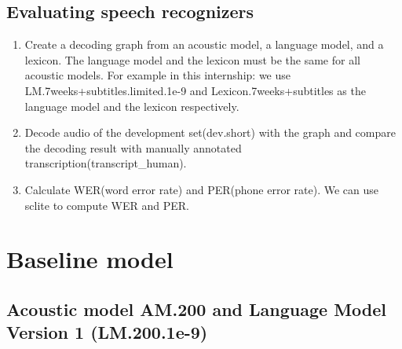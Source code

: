 \subsection{Evaluating speech recognizers}
\begin{enumerate}
\item Create a decoding graph from an acoustic model, a language model, and a lexicon. The language model and the lexicon must be the same for all acoustic models. For example in this internship: we  use LM.7weeks+subtitles.limited.1e-9 and Lexicon.7weeks+subtitles as the language model and the lexicon respectively.
\item Decode audio of the development set(dev.short) with the graph and compare the decoding result with manually annotated transcription(transcript\_human).
\item Calculate WER(word error rate) and PER(phone error rate). We can use sclite to compute WER and PER.
\end{enumerate}









\section{Baseline model}

\subsection{Acoustic model AM.200 and Language Model Version 1 (LM.200.1e-9)}
\label{amv0s1}


